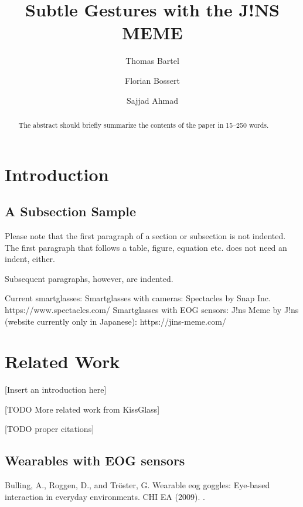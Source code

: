 \documentclass[runningheads]{llncs}
\begin{document}
%
\title{Subtle Gestures with the J!NS MEME}
%
%
\author{Thomas Bartel \and
Florian Bossert \and
Sajjad Ahmad}
%
%
%
\maketitle              %
%
\begin{abstract}
The abstract should briefly summarize the contents of the paper in
15--250 words.

\end{abstract}
%
%
%
\section{Introduction}
\subsection{A Subsection Sample}
Please note that the first paragraph of a section or subsection is
not indented. The first paragraph that follows a table, figure,
equation etc. does not need an indent, either.

Subsequent paragraphs, however, are indented.

Current smartglasses:
Smartglasses with cameras: Spectacles by Snap Inc. https://www.spectacles.com/
Smartglasses with EOG sensors: J!ns Meme by J!ns (website currently only in Japanese): https://jins-meme.com/

\section{Related Work}
[Insert an introduction here]

[TODO More related work from KissGlass]

[TODO proper citations]
\subsection{Wearables with EOG sensors}
Bulling, A., Roggen, D., and Tröster, G. Wearable eog goggles: Eye-based interaction in everyday environments. CHI EA (2009).
\cite{10.1145/3123021.3123060}.
\end{document}
